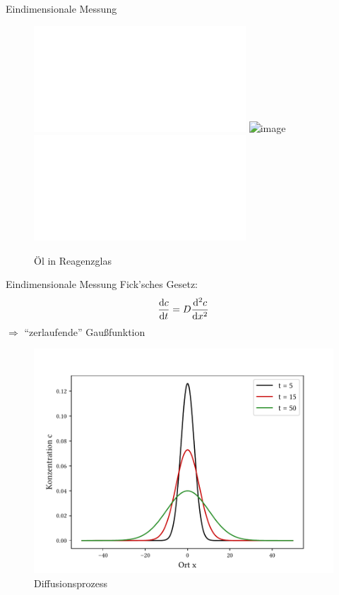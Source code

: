 \begin{frame}{Eindimensionale Messung}
	\begin{figure} %
	\centering
	\includegraphics<+>[scale=.55]{..//figures//f61_abb_8.pdf}
	\includegraphics<+>[scale=.09]{images//oilteflon.jpg}
	\includegraphics<+>[scale=.55]{..//figures//f61_abb_8.pdf}
	\caption{Öl in Reagenzglas}
	\end{figure}
	
\end{frame}

\begin{frame}{Eindimensionale Messung}
Fick'sches Gesetz: %
	\begin{align*}
	\dv{c}{t}=D\dv[2]{c}{x}
	\end{align*}
	$\Rightarrow$ \enquote{zerlaufende} Gaußfunktion
	\begin{figure}
	\centering
	\includegraphics[scale=.4]{..//figures//gaus.pdf}
	\caption{Diffusionsprozess}
	\end{figure}
\end{frame}

